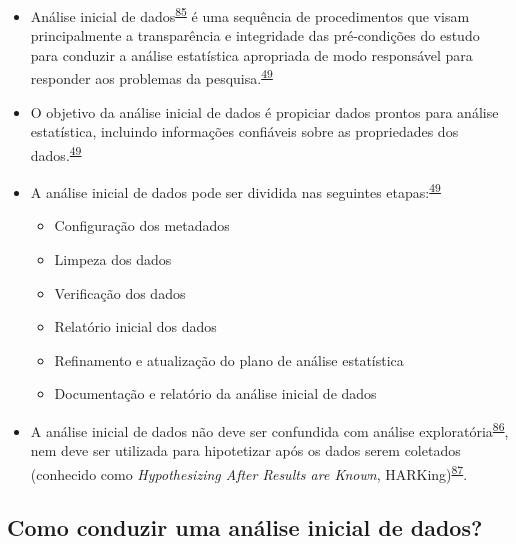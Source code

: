 \documentclass[
  a4paper,
]{book}
\begin{document}
\begin{itemize}
\item
  Análise inicial de dados\textsuperscript{\protect\hyperlink{ref-chatfield1986}{85}} é uma sequência de procedimentos que visam principalmente a transparência e integridade das pré-condições do estudo para conduzir a análise estatística apropriada de modo responsável para responder aos problemas da pesquisa.\textsuperscript{\protect\hyperlink{ref-Baillie2022}{49}}
\item
  O objetivo da análise inicial de dados é propiciar dados prontos para análise estatística, incluindo informações confiáveis sobre as propriedades dos dados.\textsuperscript{\protect\hyperlink{ref-Baillie2022}{49}}
\item
  A análise inicial de dados pode ser dividida nas seguintes etapas:\textsuperscript{\protect\hyperlink{ref-Baillie2022}{49}}

  \begin{itemize}
  \item
    Configuração dos metadados
  \item
    Limpeza dos dados
  \item
    Verificação dos dados
  \item
    Relatório inicial dos dados
  \item
    Refinamento e atualização do plano de análise estatística
  \item
    Documentação e relatório da análise inicial de dados
  \end{itemize}
\item
  A análise inicial de dados não deve ser confundida com análise exploratória\textsuperscript{\protect\hyperlink{ref-Ferketich1986}{86}}, nem deve ser utilizada para hipotetizar após os dados serem coletados (conhecido como \emph{Hypothesizing After Results are Known}, HARKing)\textsuperscript{\protect\hyperlink{ref-Kerr1998}{87}}.
\end{itemize}

\hypertarget{como-conduzir-uma-anuxe1lise-inicial-de-dados}{%
\subsection{Como conduzir uma análise inicial de dados?}\label{como-conduzir-uma-anuxe1lise-inicial-de-dados}}
\end{document}
